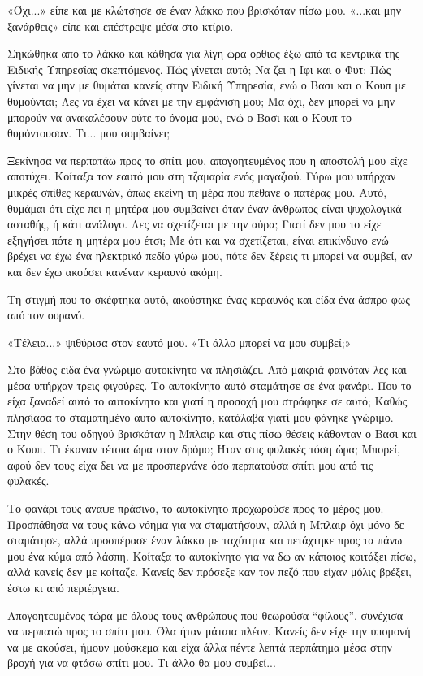 \documentclass[12pt,twoside, openany]{book}
\begin{document}
«Όχι...» είπε και με κλώτσησε σε έναν λάκκο που βρισκόταν πίσω μου. «...και μην ξανάρθεις» είπε και επέστρεψε μέσα στο κτίριο.

Σηκώθηκα από το λάκκο και κάθησα για λίγη ώρα όρθιος έξω από τα κεντρικά της Ειδικής Υπηρεσίας σκεπτόμενος. Πώς γίνεται αυτό; Να ζει η Ιφι και ο Φυτ; Πώς γίνεται να μην με θυμάται κανείς στην Ειδική Υπηρεσία, ενώ ο Βασι και ο Κουπ με θυμούνται; Λες να έχει να κάνει με την εμφάνιση μου; Μα όχι, δεν μπορεί να μην μπορούν να ανακαλέσουν ούτε το όνομα μου, ενώ ο Βασι και ο Κουπ το θυμόντουσαν. Τι... μου συμβαίνει;

Ξεκίνησα να περπατάω προς το σπίτι μου, απογοητευμένος που η αποστολή μου είχε αποτύχει. Κοίταξα τον εαυτό μου στη τζαμαρία ενός μαγαζιού. Γύρω μου υπήρχαν μικρές σπίθες κεραυνών, όπως εκείνη τη μέρα που πέθανε ο πατέρας μου. Αυτό, θυμάμαι ότι είχε πει η μητέρα μου συμβαίνει όταν έναν άνθρωπος είναι ψυχολογικά ασταθής, ή κάτι ανάλογο. Λες να σχετίζεται με την αύρα; Γιατί δεν μου το είχε εξηγήσει πότε η μητέρα μου έτσι; Με ότι και να σχετίζεται, είναι επικίνδυνο ενώ βρέχει να έχω ένα ηλεκτρικό πεδίο γύρω μου, πότε δεν ξέρεις τι μπορεί να συμβεί, αν και δεν έχω ακούσει κανέναν κεραυνό ακόμη.

Τη στιγμή που το σκέφτηκα αυτό, ακούστηκε ένας κεραυνός και είδα ένα άσπρο φως από τον ουρανό.

«Τέλεια...» ψιθύρισα στον εαυτό μου. «Τι άλλο μπορεί να μου συμβεί;»

Στο βάθος είδα ένα γνώριμο αυτοκίνητο να πλησιάζει. Από μακριά φαινόταν λες και μέσα υπήρχαν τρεις φιγούρες. Το αυτοκίνητο αυτό σταμάτησε σε ένα φανάρι. Που το είχα ξαναδεί αυτό το αυτοκίνητο και γιατί η προσοχή μου στράφηκε σε αυτό; Καθώς πλησίασα το σταματημένο αυτό αυτοκίνητο, κατάλαβα γιατί μου φάνηκε γνώριμο. Στην θέση του οδηγού βρισκόταν η Μπλαιρ και στις πίσω θέσεις κάθονταν ο Βασι και ο Κουπ. Τι έκαναν τέτοια ώρα στον δρόμο; Ήταν στις φυλακές τόση ώρα; Μπορεί, αφού δεν τους είχα δει να με προσπερνάνε όσο περπατούσα σπίτι μου από τις φυλακές.

Το φανάρι τους άναψε πράσινο, το αυτοκίνητο προχωρούσε προς το μέρος μου. Προσπάθησα να τους κάνω νόημα για να σταματήσουν, αλλά η Μπλαιρ όχι μόνο δε σταμάτησε, αλλά προσπέρασε έναν λάκκο με ταχύτητα και πετάχτηκε προς τα πάνω μου ένα κύμα από λάσπη. Κοίταξα το αυτοκίνητο για να δω αν κάποιος κοιτάξει πίσω, αλλά κανείς δεν με κοίταζε. Κανείς δεν πρόσεξε καν τον πεζό που είχαν μόλις βρέξει, έστω κι από περιέργεια.

Απογοητευμένος τώρα με όλους τους ανθρώπους που θεωρούσα “φίλους”, συνέχισα να περπατώ προς το σπίτι μου. Όλα ήταν μάταια πλέον. Κανείς δεν είχε την υπομονή να με ακούσει, ήμουν μούσκεμα και είχα άλλα πέντε λεπτά περπάτημα μέσα στην βροχή για να φτάσω σπίτι μου. Τι άλλο θα μου συμβεί...
\end{document}
